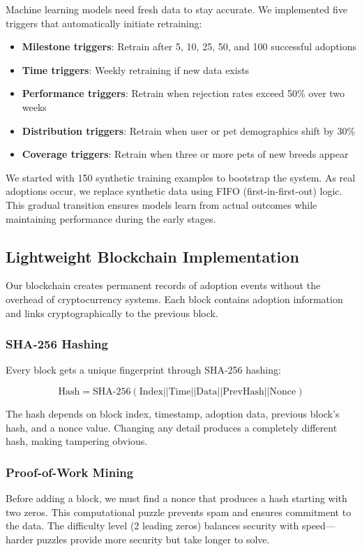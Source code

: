 \documentclass[conference]{IEEEtran}
\begin{document}
Machine learning models need fresh data to stay accurate. We implemented five triggers that automatically initiate retraining:

\begin{itemize}
\item \textbf{Milestone triggers}: Retrain after 5, 10, 25, 50, and 100 successful adoptions
\item \textbf{Time triggers}: Weekly retraining if new data exists
\item \textbf{Performance triggers}: Retrain when rejection rates exceed 50\% over two weeks
\item \textbf{Distribution triggers}: Retrain when user or pet demographics shift by 30\%
\item \textbf{Coverage triggers}: Retrain when three or more pets of new breeds appear
\end{itemize}

We started with 150 synthetic training examples to bootstrap the system. As real adoptions occur, we replace synthetic data using FIFO (first-in-first-out) logic. This gradual transition ensures models learn from actual outcomes while maintaining performance during the early stages.

\subsection{Lightweight Blockchain Implementation}

Our blockchain creates permanent records of adoption events without the overhead of cryptocurrency systems. Each block contains adoption information and links cryptographically to the previous block.

\subsubsection{SHA-256 Hashing}
Every block gets a unique fingerprint through SHA-256 hashing:

\begin{equation}
\text{Hash} = \text{SHA-256}(\text{Index} || \text{Time} || \text{Data} || \text{PrevHash} || \text{Nonce})
\end{equation}

The hash depends on block index, timestamp, adoption data, previous block's hash, and a nonce value. Changing any detail produces a completely different hash, making tampering obvious.

\subsubsection{Proof-of-Work Mining}
Before adding a block, we must find a nonce that produces a hash starting with two zeros. This computational puzzle prevents spam and ensures commitment to the data. The difficulty level (2 leading zeros) balances security with speed—harder puzzles provide more security but take longer to solve.
\end{document}
